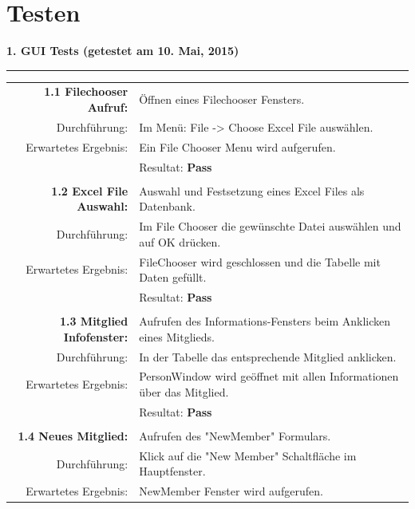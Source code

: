 \documentclass{article}
\begin{document}
\section{Testen}
\textbf{1. GUI Tests (getestet am 10. Mai, 2015)\\}
\rule[2mm]{1\linewidth}{0.3mm}
\begin{tabular}{r|p{12cm}}
	\textbf{1.1 Filechooser Aufruf:} & Öffnen eines Filechooser Fensters.\\
		Durchführung:			& Im Menü: File -> Choose Excel File auswählen.	\\			
		Erwartetes Ergebnis: 	& Ein File Chooser Menu wird aufgerufen. \\
								& Resultat:  \textbf{Pass}\hspace{8.4cm} \color{green} {\ding{51}} \\
		\\
	\textbf{1.2 Excel File Auswahl:} & Auswahl und Festsetzung eines Excel Files als Datenbank.\\
		Durchführung:			& 	Im File Chooser die gewünschte Datei auswählen und auf OK 		drücken.\\
		Erwartetes Ergebnis: 	&	FileChooser wird geschlossen und die Tabelle mit Daten gefüllt. \\
								& Resultat:  \textbf{Pass}\hspace{8.4cm} \color{green} {\ding{51}} \\
	\\
	\textbf{1.3 Mitglied Infofenster:} & Aufrufen des Informations-Fensters beim Anklicken eines Mitglieds. \\
		Durchführung:			& In der Tabelle das entsprechende Mitglied anklicken. \\
		Erwartetes Ergebnis: 	& PersonWindow wird geöffnet mit allen Informationen über das Mitglied.\\
								& Resultat:  \textbf{Pass}\hspace{8.4cm} \color{green} {\ding{51}} \\
							\\
	\textbf{1.4 Neues Mitglied:} & Aufrufen des "NewMember" Formulars. \\
		Durchführung:			& Klick auf die "New Member" Schaltfläche im Hauptfenster.\\
		Erwartetes Ergebnis: 	& NewMember Fenster wird aufgerufen. \\

\end{tabular}
\end{document}
